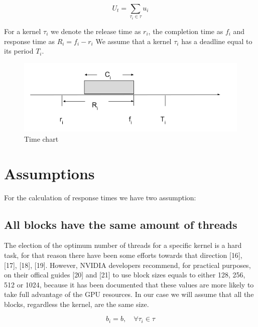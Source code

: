 \documentclass[
  12pt,
  a4paperpaper,
]{report}
\begin{document}
\begin{equation} 
U_t = \sum_{\tau_i \in \tau} u_i
\label{eq:task_utilization}
\end{equation}

For a kernel \(\tau_i\) we denote the release time as \(r_i\), the
completion time as \(f_i\) and response time as \(R_i = f_i - r_i\) We
assume that a kernel \(\tau_i\) has a deadline equal to its period
\(T_i\).

\begin{figure}
\centering
\includegraphics[width=1\textwidth,height=\textheight]{source/figures/task_timing.png}
\caption{Time chart \label{img:task_timing}}
\end{figure}

\hypertarget{assumptions}{%
\section{Assumptions}\label{assumptions}}

For the calculation of response times we have two assumption:

\hypertarget{all-blocks-have-the-same-amount-of-threads}{%
\subsection{All blocks have the same amount of
threads}\label{all-blocks-have-the-same-amount-of-threads}}

The election of the optimum number of threads for a specific kernel is a
hard task, for that reason there have been some efforts towards that
direction {[}16{]}, {[}17{]}, {[}18{]}, {[}19{]}. However, NVIDIA
developers recommend, for practical purposes, on their offical guides
{[}20{]} and {[}21{]} to use block sizes equals to either 128, 256, 512
or 1024, because it has been documented that these values are more
likely to take full advantage of the GPU resources. In our case we will
assume that all the blocks, regardless the kernel, are the same size.

\begin{equation} 
b_i = b, \quad \forall \tau_i \in \tau
\label{eq:blocksize}
\end{equation}
\end{document}

